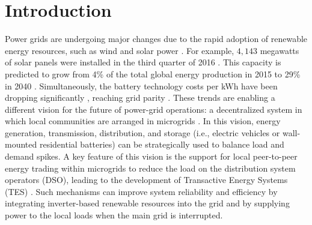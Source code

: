 




\section{Introduction}

Power grids are undergoing major changes due to the
rapid adoption of renewable energy resources, such as wind and solar power \cite{EIA2014,5430489}. For example, 
$4,\!143$ megawatts of solar panels were installed in the third quarter of 2016 \cite{seia}. This capacity is predicted to grow from 4\% of the total global energy production
in 2015 to 29\% in 2040 \cite{Randal}. Simultaneously, the battery technology costs per kWh have been dropping significantly \cite{stock2015powerful}, reaching grid parity \cite{bronski2015economics}. These trends are enabling a different vision for the future of power-grid operations: a decentralized system in which local communities are arranged in microgrids \cite{rahimi2012transactive}. In this vision, energy generation, transmission, distribution, and storage (i.e., electric vehicles or wall-mounted residential batteries) can be strategically used to balance load and demand spikes. A key feature of this vision is the support for local peer-to-peer energy trading within microgrids to reduce the load on the distribution system operators (DSO), leading to the development of Transactive Energy Systems (TES) \cite{kok2016society,cox2013structured,melton2013gridwise}. Such mechanisms 
can improve system reliability and efficiency by integrating inverter-based renewable resources into the grid and by supplying power to the local loads when the main grid is  interrupted. 


